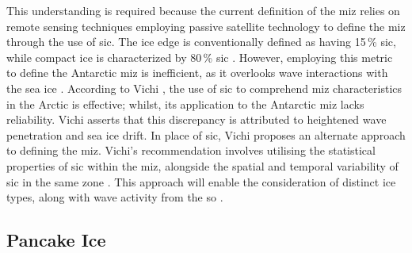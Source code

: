 
This understanding is required because the current definition of the \acs{miz} relies on remote sensing techniques employing passive satellite technology to define the \acs{miz} through the use of \ac{sic}. The ice edge is conventionally defined as having 15\,\% \acs{sic}, while compact ice is characterized by 80\,\% \acs{sic} \cite{WMO2014}. However, employing this metric to define the Antarctic \acs{miz} is inefficient, as it overlooks wave interactions with the sea ice \cite{Brouwer2022,Vichi2021}. According to Vichi \cite{Vichi2021}, the use of \acs{sic} to comprehend \acs{miz} characteristics in the Arctic is effective; whilst, its application to the Antarctic \acs{miz} lacks reliability. Vichi \cite{Vichi2019,Vichi2021} asserts that this discrepancy is attributed to heightened wave penetration and sea ice drift. In place of \acs{sic}, Vichi proposes an alternate approach to defining the \acs{miz}. Vichi's recommendation involves utilising the statistical properties of \acs{sic} within the \acs{miz}, alongside the spatial and temporal variability of \acs{sic} in the same zone \cite{Vichi2021}. This approach will enable the consideration of distinct ice types, along with wave activity from the \acs{so} \cite{Vichi2021}.


\subsection{Pancake Ice} \label{subsec:litReview.antarctica.pancakeIce}

